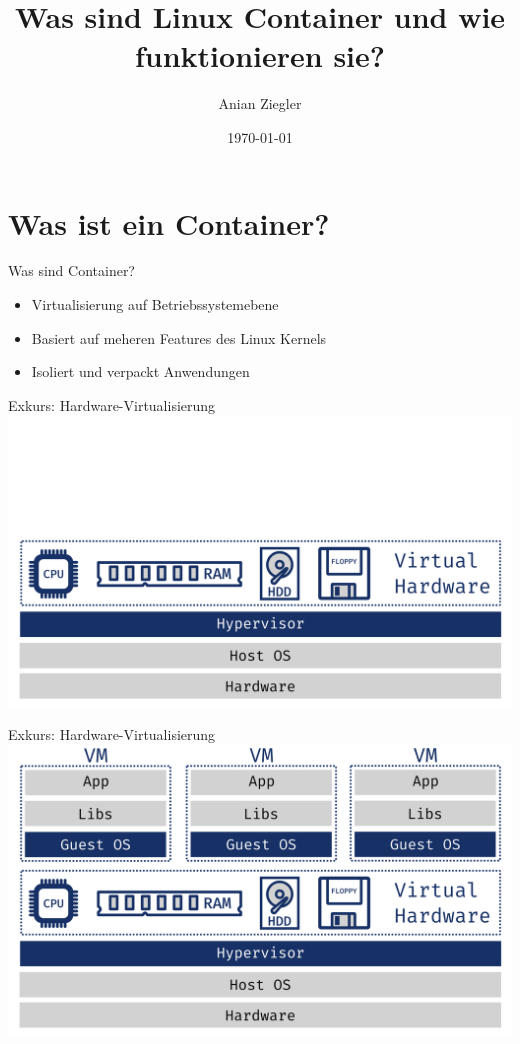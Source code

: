 \documentclass{beamer}
\title{Was sind Linux Container und wie funktionieren sie?}
\date{\today}
\author{Anian Ziegler}
\institute{cioplenu}
\begin{document}
  \maketitle
  \section{Was ist ein Container?}
  \begin{frame}{Was sind Container?}
    \begin{itemize}
      \item Virtualisierung auf Betriebssystemebene
      \item Basiert auf meheren Features des Linux Kernels
      \item Isoliert und verpackt Anwendungen
    \end{itemize}
  \end{frame}
  \begin{frame}{Exkurs: Hardware-Virtualisierung}
    \includegraphics[width=\textwidth]{hypervisor}
  \end{frame}
  \begin{frame}{Exkurs: Hardware-Virtualisierung}
    \includegraphics[width=\textwidth]{vms}
  \end{frame}
\end{document}
